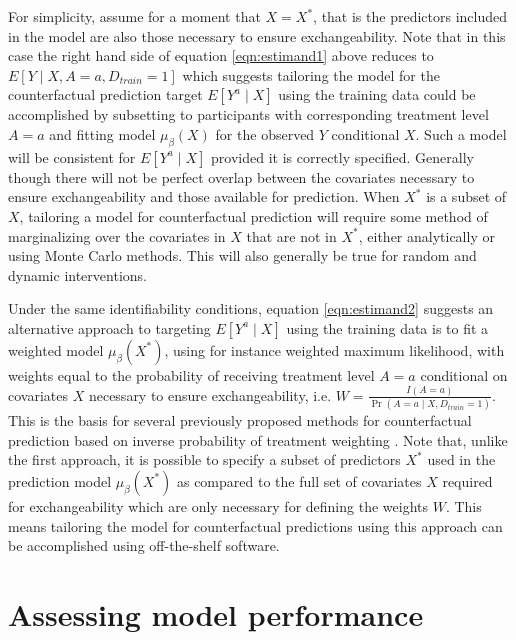 For simplicity, assume for a moment that $X = X^*$, that is the predictors included in the model are also those necessary to ensure exchangeability. Note that in this case the right hand side of equation \ref{eqn:estimand1} above reduces to $E[Y \mid X, A = a, D_{train} =1]$ which suggests tailoring the model for the counterfactual prediction target $E[Y^a \mid X]$ using the training data could be accomplished by subsetting to participants with corresponding treatment level $A = a$ and fitting model $\mu_\beta(X)$ for the observed $Y$ conditional $X$. Such a model will be consistent for $E[Y^a \mid X]$ provided it is correctly specified. Generally though there will not be perfect overlap between the covariates necessary to ensure exchangeability and those available for prediction. When $X^*$ is a subset of $X$, tailoring a model for counterfactual prediction will require some method of marginalizing over the covariates in $X$ that are not in $X^*$, either analytically or using Monte Carlo methods. This will also generally be true for random and dynamic interventions.

Under the same identifiability conditions, equation \ref{eqn:estimand2} suggests an alternative approach to targeting $E[Y^a \mid X]$ using the training data is to fit a weighted model $\mu_\beta(X^*)$, using for instance weighted maximum likelihood, with weights equal to the probability of receiving treatment level $A = a$ conditional on covariates $X$ necessary to ensure exchangeability, i.e. $W = \frac{I(A = a)}{\Pr(A = a \mid X, D_{train} = 1)}$. This is the basis for several previously proposed methods for counterfactual prediction based on inverse probability of treatment weighting \cite{sperrin_using_2018}. Note that, unlike the first approach, it is possible to specify a subset of predictors $X^*$ used in the prediction model $\mu_\beta(X^*)$ as compared to the full set of covariates $X$ required for exchangeability which are only necessary for defining the weights $W$. This means tailoring the model for counterfactual predictions using this approach can be accomplished using off-the-shelf software.

\section{Assessing model performance} \label{sec:performance}

